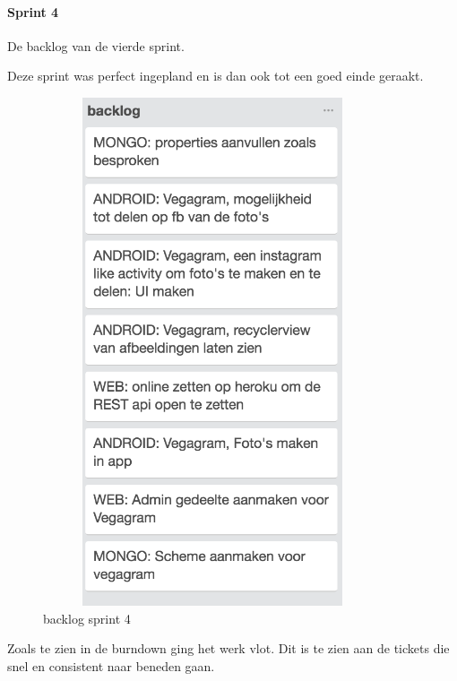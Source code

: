 \paragraph{Sprint 4}
De backlog van de vierde sprint.

Deze sprint was perfect ingepland en is dan ook tot een goed einde geraakt.

\begin{figure}[h]
	\centering
\includegraphics[width=10cm,height=15cm]{img/backlog_week4.png}
\caption{backlog sprint 4}
\end{figure}

Zoals te zien in de burndown ging het werk vlot. Dit is te zien aan de tickets die snel en consistent naar beneden gaan. 

